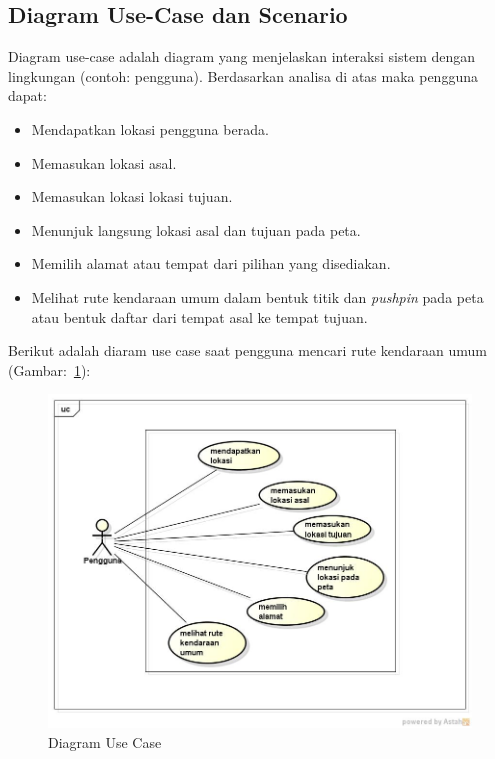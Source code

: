 \subsection{Diagram Use-Case dan Scenario}
\label{lab:Diagram Use-Case dan Scenario}
\hspace{0.5cm} Diagram use-case adalah diagram yang menjelaskan interaksi sistem dengan lingkungan (contoh: pengguna). Berdasarkan analisa di atas maka pengguna dapat:
\begin{itemize}
	\item Mendapatkan lokasi pengguna berada.
	\item Memasukan lokasi asal.
	\item Memasukan lokasi lokasi tujuan.
	\item Menunjuk langsung lokasi asal dan tujuan pada peta.
	\item Memilih alamat atau tempat dari pilihan yang disediakan.
	\item Melihat rute kendaraan umum dalam bentuk titik dan \textit{pushpin} pada peta atau bentuk daftar dari tempat asal ke tempat tujuan.
\end{itemize}

Berikut adalah diaram use case saat pengguna mencari rute kendaraan umum (Gambar:~\ref{fig:UseCase}):
\begin{figure}[h]
	\centering
		\includegraphics[scale=0.5]{Gambar/useCase_dan_Class/UseCase}
	\caption{Diagram Use Case}
	\label{fig:UseCase}
\end{figure}

